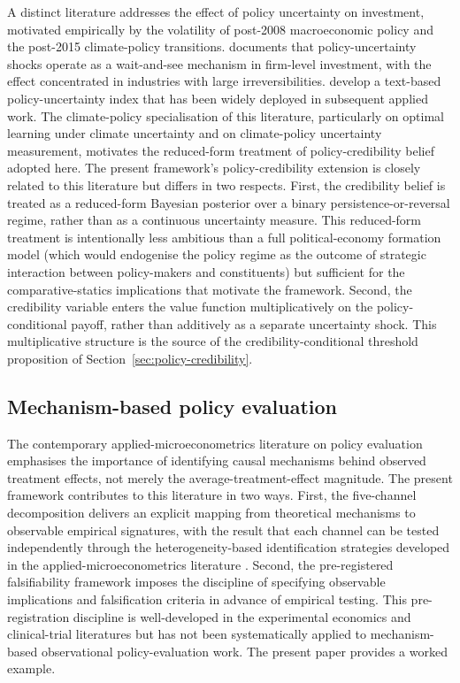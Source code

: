 \documentclass[12pt,a4paper]{article}
\theoremstyle{plain}
\theoremstyle{definition}
\begin{document}
A distinct literature addresses the effect of policy uncertainty on investment, motivated empirically by the volatility of post-2008 macroeconomic policy and the post-2015 climate-policy transitions. \cite{bloom2009impact} documents that policy-uncertainty shocks operate as a wait-and-see mechanism in firm-level investment, with the effect concentrated in industries with large irreversibilities. \cite{baker2016measuring} develop a text-based policy-uncertainty index that has been widely deployed in subsequent applied work. The climate-policy specialisation of this literature, particularly \citet{vanwijnbergen2012optimal} on optimal learning under climate uncertainty and \citet{berestycki2025climate} on climate-policy uncertainty measurement, motivates the reduced-form treatment of policy-credibility belief adopted here. The present framework's policy-credibility extension is closely related to this literature but differs in two respects. First, the credibility belief is treated as a reduced-form Bayesian posterior over a binary persistence-or-reversal regime, rather than as a continuous uncertainty measure. This reduced-form treatment is intentionally less ambitious than a full political-economy formation model (which would endogenise the policy regime as the outcome of strategic interaction between policy-makers and constituents) but sufficient for the comparative-statics implications that motivate the framework. Second, the credibility variable enters the value function multiplicatively on the policy-conditional payoff, rather than additively as a separate uncertainty shock. This multiplicative structure is the source of the credibility-conditional threshold proposition of Section~\ref{sec:policy-credibility}.

\subsection{Mechanism-based policy evaluation}
\label{sec:lit-mechanism}

The contemporary applied-microeconometrics literature on policy evaluation \citep{angrist2010credibility, athey2017state} emphasises the importance of identifying causal mechanisms behind observed treatment effects, not merely the average-treatment-effect magnitude. The present framework contributes to this literature in two ways. First, the five-channel decomposition delivers an explicit mapping from theoretical mechanisms to observable empirical signatures, with the result that each channel can be tested independently through the heterogeneity-based identification strategies developed in the applied-microeconometrics literature \citep{deaner2019hazard, deaner2022hazard}. Second, the pre-registered falsifiability framework imposes the discipline of specifying observable implications and falsification criteria in advance of empirical testing. This pre-registration discipline is well-developed in the experimental economics and clinical-trial literatures \citep{olken2015promises} but has not been systematically applied to mechanism-based observational policy-evaluation work. The present paper provides a worked example.
\end{document}
